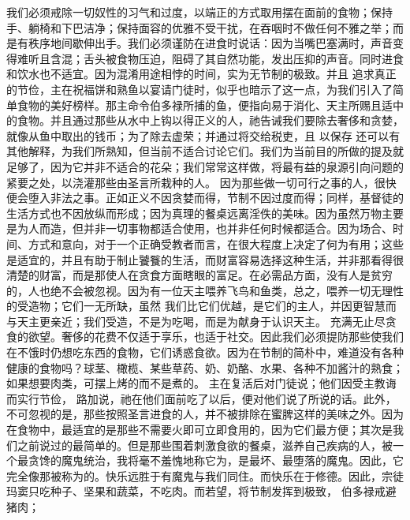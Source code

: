 我们必须戒除一切奴性的习气和过度，以端正的方式取用摆在面前的食物；保持手、躺椅和下巴洁净；保持面容的优雅不受干扰，在吞咽时不做任何不雅之举；而是有秩序地间歇伸出手。我们必须谨防在进食时说话：因为当嘴巴塞满时，声音变得难听且含混；舌头被食物压迫，阻碍了其自然功能，发出压抑的声音。同时进食和饮水也不适宜。因为混淆用途相悖的时间，实为无节制的极致。并且  追求真正的节俭，主在祝福饼和熟鱼以宴请门徒时，似乎也暗示了这一点，为我们引入了简单食物的美好榜样。那主命令伯多禄所捕的鱼，便指向易于消化、天主所赐且适中的食物。并且通过那些从水中上钩以得正义的人，祂告诫我们要除去奢侈和贪婪，就像从鱼中取出的钱币；为了除去虚荣；并通过将交给税吏，且 以保存  还可以有其他解释，为我们所熟知，但当前不适合讨论它们。我们为当前目的所做的提及就足够了，因为它并非不适合的花朵；我们常常这样做，将最有益的泉源引向问题的紧要之处，以浇灌那些由圣言所栽种的人。  因为那些做一切可行之事的人，很快便会堕入非法之事。正如正义不因贪婪而得，节制不因过度而得；同样，基督徒的生活方式也不因放纵而形成；因为真理的餐桌远离淫佚的美味。因为虽然万物主要是为人而造，但并非一切事物都适合使用，也并非任何时候都适合。因为场合、时间、方式和意向，对于一个正确受教者而言，在很大程度上决定了何为有用；这些是适宜的，并且有助于制止饕餮的生活，而财富容易选择这种生活，并非那看得很清楚的财富，而是那使人在贪食方面瞎眼的富足。在必需品方面，没有人是贫穷的，人也绝不会被忽视。因为有一位天主喂养飞鸟和鱼类，总之，喂养一切无理性的受造物；它们一无所缺，虽然  我们比它们优越，是它们的主人，并因更智慧而与天主更亲近；我们受造，不是为吃喝，而是为献身于认识天主。  充满无止尽贪食的欲望。奢侈的花费不仅适于享乐，也适于社交。因此我们必须提防那些使我们在不饿时仍想吃东西的食物，它们诱惑食欲。因为在节制的简朴中，难道没有各种健康的食物吗？球茎、橄榄、某些草药、奶、奶酪、水果、各种不加酱汁的熟食；如果想要肉类，可摆上烤的而不是煮的。  主在复活后对门徒说；他们因受主教诲而实行节俭， 路加说，祂在他们面前吃了以后，便对他们说了所说的话。此外，不可忽视的是，那些按照圣言进食的人，并不被排除在蜜脾这样的美味之外。因为在食物中，最适宜的是那些不需要火即可立即食用的，因为它们最方便；其次是我们之前说过的最简单的。但是那些围着刺激食欲的餐桌，滋养自己疾病的人，被一个最贪馋的魔鬼统治，我将毫不羞愧地称它为，是最坏、最堕落的魔鬼。因此，它完全像那被称为的。快乐远胜于有魔鬼与我们同住。而快乐在于修德。因此，宗徒玛窦只吃种子、坚果和蔬菜，不吃肉。而若望，将节制发挥到极致， 伯多禄戒避猪肉； 